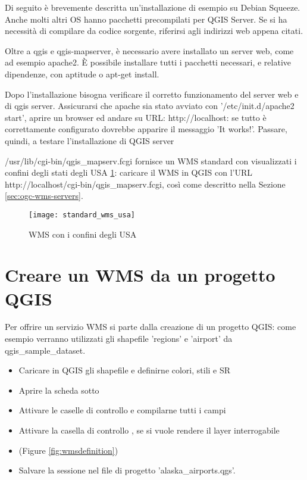 Di seguito è brevemente descritta un'installazione di esempio su Debian Squeeze. 
Anche molti altri OS hanno pacchetti precompilati per QGIS Server. Se si ha necessità 
di compilare da codice sorgente, riferirsi agli indirizzi web appena citati.

Oltre a qgis e qgis-mapserver, è necessario avere installato un server web, come ad esempio apache2. 
È possibile installare tutti i pacchetti necessari, e relative dipendenze, con aptitude o apt-get install.

Dopo l'installazione bisogna verificare il corretto funzionamento del server web e di qgis server. 
Assicurarsi che apache sia stato avviato con '/etc/init.d/apache2 start', aprire un browser ed andare su 
URL: http://localhost: se tutto è correttamente configurato dovrebbe apparire il messaggio 'It works!'.
Passare, quindi, a testare l'installazione di QGIS server

/usr/lib/cgi-bin/qgis\_mapserv.fcgi fornisce un WMS standard 
con visualizzati i confini degli stati degli USA \ref{fig:usa_wms}: caricare il WMS in QGIS con 
l'URL http://localhost/cgi-bin/qgis\_mapserv.fcgi, così come descritto nella Sezione \ref{sec:ogc-wms-servers}.

\begin{figure}[ht]
\centering
\texttt{[image: standard\_wms\_usa]}
\caption{WMS con i confini degli USA \nixcaption}
\label{fig:usa_wms}
\end{figure}

\section{Creare un WMS da un progetto QGIS}

Per offrire un servizio WMS si parte dalla creazione di un progetto QGIS: come esempio 
verranno utilizzati gli shapefile 'regions' e 'airport' da qgis\_sample\_dataset. 

\begin{itemize}[label=--]
\item Caricare in QGIS gli shapefile e definirne colori, stili e SR
\item Aprire la scheda  sotto  \arrow {}
\item Attivare le caselle di controllo   
  e compilarne tutti i campi
\item Attivare la casella di controllo , 
se si vuole rendere il layer interrogabile
\item (Figure \ref{fig:wmsdefinition})
\item Salvare la sessione nel file di progetto 'alaska\_airports.qgs'.
\end{itemize}

